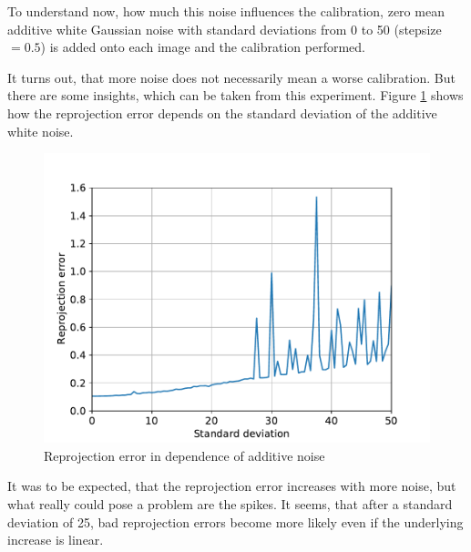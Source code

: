 To understand now, how much this noise influences the calibration, zero mean additive white Gaussian noise with standard deviations from 0 to 50 (stepsize $=0.5$) is added onto each image and the calibration performed. 

It turns out, that more noise does not necessarily mean a worse calibration.
But there are some insights, which can be taken from this experiment.
Figure \ref{development:noise_rpe} shows how the reprojection error depends on the standard deviation of the additive white noise.
\begin{figure}
	\centering
	\includegraphics[width=0.9\linewidth]{3-development/calibration/images/noise_rpe.pdf}
	\caption{Reprojection error in dependence of additive noise\label{development:noise_rpe}}
\end{figure}
It was to be expected, that the reprojection error increases with more noise, but what really could pose a problem are the spikes.
It seems, that after a standard deviation of 25, bad reprojection errors become more likely even if the underlying increase is linear.

